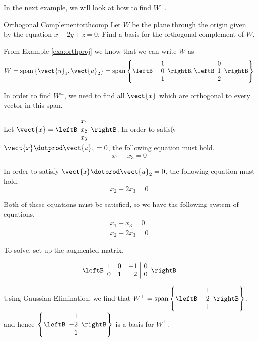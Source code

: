 In the next example, we will look at how to find
$W^{\perp}$.

\begin{example}{Orthogonal Complement}{orthcomp}
Let $W$ be the  plane through the origin given by the equation  $x - 2y + z = 0$. Find
a basis for the orthogonal complement of $W$.
\end{example}

\begin{solution}

From Example \ref{exa:orthproj} we know that we can write $W$ as 
\[
W = \mbox{span} \left\{ \vect{u}_1, \vect{u}_2 \right\} = \mbox{span} 
\left\{
\leftB
\begin{array}{r}
1 \\
0 \\
-1
\end{array}
\rightB,
\leftB
\begin{array}{c}
0 \\
1 \\
2
\end{array}
\rightB
\right\}
\]

In order to find $W^{\perp}$, we need to find all $\vect{x}$ which are orthogonal to every vector in this span. 

Let $\vect{x} = \leftB
\begin{array}{c}
x_1 \\
x_2 \\
x_3
\end{array}
\rightB$. 
In order to satisfy $\vect{x} \dotprod \vect{u}_1 = 0$, the following equation must hold. 
\[
x_1 - x_3 = 0
\]

In order to satisfy $\vect{x} \dotprod \vect{u}_2 = 0$, the following equation must hold.
\[
x_2 + 2x_3 = 0 
\]

Both of these equations must be satisfied, so we have the following system of equations. 
\[
\begin{array}{c}
x_1 - x_3 = 0 \\
x_2 + 2x_3 = 0
\end{array}
\]

To solve, set up the augmented matrix. 

\[
\leftB \begin{array}{rrr|r}
1 & 0 & -1 & 0 \\
0 & 1 & 2 & 0 
\end{array} \rightB
\]

Using Gaussian Elimination, we find that $W^{\perp} = \mbox{span} \left\{ \leftB
\begin{array}{r}
1 \\
-2 \\
1
\end{array}
\rightB
\right\}$, and hence 
$\left\{ \leftB
\begin{array}{r}
1 \\
-2 \\
1
\end{array}
\rightB
\right\}$ is a basis for  $W^{\perp}$. 
\end{solution}

